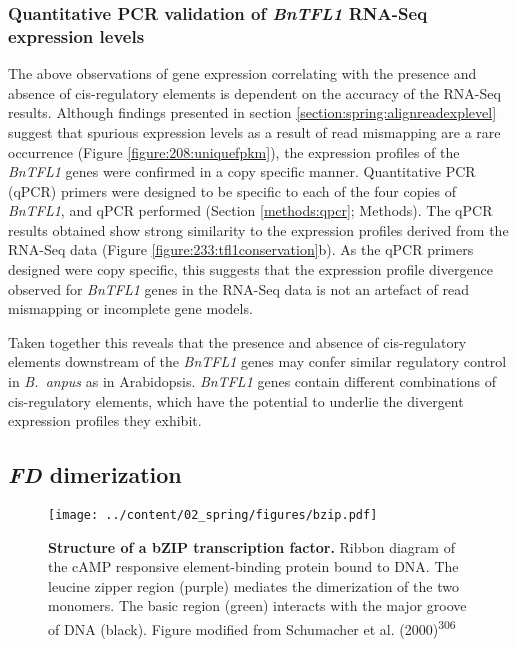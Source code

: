 \documentclass[12pt,]{book}
\begin{document}
\subsubsection{\texorpdfstring{Quantitative PCR validation of
\emph{BnTFL1} RNA-Seq expression
levels}{Quantitative PCR validation of BnTFL1 RNA-Seq expression levels}}\label{section:spring:tfl1qpcr}

The above observations of gene expression correlating with the presence
and absence of cis-regulatory elements is dependent on the accuracy of
the RNA-Seq results. Although findings presented in section
\ref{section:spring:alignreadexplevel} suggest that spurious expression
levels as a result of read mismapping are a rare occurrence (Figure
\ref{figure:208:uniquefpkm}), the expression profiles of the
\emph{BnTFL1} genes were confirmed in a copy specific manner.
Quantitative PCR (qPCR) primers were designed to be specific to each of
the four copies of \emph{BnTFL1}, and qPCR performed (Section
\ref{methods:qpcr}; Methods). The qPCR results obtained show strong
similarity to the expression profiles derived from the RNA-Seq data
(Figure \ref{figure:233:tfl1conservation}b). As the qPCR primers
designed were copy specific, this suggests that the expression profile
divergence observed for \emph{BnTFL1} genes in the RNA-Seq data is not
an artefact of read mismapping or incomplete gene models.

Taken together this reveals that the presence and absence of
cis-regulatory elements downstream of the \emph{BnTFL1} genes may confer
similar regulatory control in \emph{B.~anpus} as in Arabidopsis.
\emph{BnTFL1} genes contain different combinations of cis-regulatory
elements, which have the potential to underlie the divergent expression
profiles they exhibit.

\subsection{\texorpdfstring{\emph{FD}
dimerization}{FD dimerization}}\label{section:spring:fdprotein}

\begin{figure}[htbp]
\centering
\texttt{[image: ../content/02\_spring/figures/bzip.pdf]}
\caption{\textbf{Structure of a bZIP transcription factor.} Ribbon
diagram of the cAMP responsive element-binding protein bound to DNA. The
leucine zipper region (purple) mediates the dimerization of the two
monomers. The basic region (green) interacts with the major groove of
DNA (black). Figure modified from Schumacher et al.
(2000)\textsuperscript{306}}\label{figure:2xx:bzip}
\end{figure}
\end{document}
